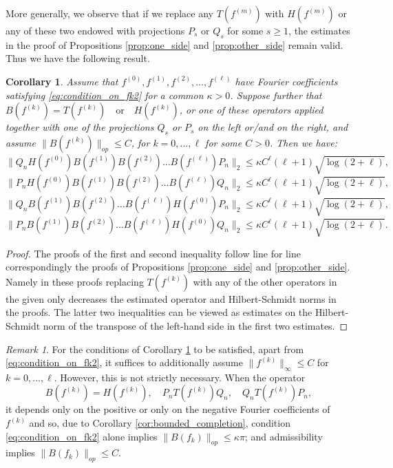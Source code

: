 \documentclass[11pt]{amsart}
\theoremstyle{plain}
\newtheorem{corollary}[theorem]{Corollary}
\theoremstyle{remark}
\newtheorem{remark}[theorem]{Remark}
\numberwithin{equation}{section}
\begin{document}
More generally, we observe that if we replace any $T(f^{(m)})$ with $H(f^{(m)})$ or any of these two endowed with projections $P_s$ or $Q_s$ for some $s\geq 1$, the estimates in the proof of Propositions \ref{prop:one_side} and \ref{prop:other_side} remain valid. Thus we have the following result. 

\begin{corollary} \label{cor:important_estimate}
Assume that 
$f^{(0)},f^{(1)}, f^{(2)}, \ldots, f^{(\ell)}$
%
have
Fourier coefficients 
satisfying \eqref{eq:condition_on_fk2} for a common $\kappa>0$.
%
%
Suppose further that 
$B(f^{(k)})= T(f^{(k)})\quad \text{or}\quad H(f^{(k)})$, or one of these operators applied together with one of the projections $Q_s$ or $P_s$ on the left or/and on the right, and assume $\|B(f^{(k)})\|_{op}\leq C$, for $k=0,\ldots,\ell$ for some $C>0$.
Then we have: 
\begin{equation}
\|Q_n H(f^{(0)}) B(f^{(1)}) B(f^{(2)})\ldots B(f^{(\ell)})P_n\|_2\leq \kappa C^{\ell} (\ell+1) \sqrt{\log(2+\ell)},
\end{equation} 
\begin{equation}
\|P_n H(f^{(0)}) B(f^{(1)}) B(f^{(2)})\ldots B(f^{(\ell)})Q_n\|_2\leq \kappa C^{\ell} (\ell+1) \sqrt{\log(2+\ell)},
\end{equation}
\begin{equation}
\|Q_n B(f^{(1)}) B(f^{(2)})\ldots B(f^{(\ell)})H(f^{(0)})P_n\|_2\leq \kappa C^{\ell} (\ell+1) \sqrt{\log(2+\ell)},
\end{equation} 
\begin{equation}
\|P_n   B(f^{(1)}) B(f^{(2)})\ldots B(f^{(\ell)})H(f^{(0)}) Q_n\|_2\leq \kappa C^{\ell} (\ell+1) \sqrt{\log(2+\ell)}.
\end{equation}
\end{corollary}

\begin{proof}
The proofs of the first and second inequality follow line for line correspondingly the proofs of Propositions \ref{prop:one_side} and \ref{prop:other_side}.  Namely in these proofs replacing $T(f^{(k)})$ with any of the other operators in the given only decreases the estimated operator and Hilbert-Schmidt norms in the proofs.
%
%
The latter two inequalities can be viewed as estimates on the Hilbert-Schmidt norm of the transpose of the left-hand side in the first two estimates. 
\end{proof}

\begin{remark}\label{rmk:important_estimate}
For the conditions of Corollary \ref{cor:important_estimate} to be satisfied, apart from \eqref{eq:condition_on_fk2}, it suffices to additionally assume $\|f^{(k)}\|_{\infty}\leq C$ for $k=0,\ldots, \ell$. However, this is not strictly necessary. When the operator
$$B(f^{(k)})=H(f^{(k)}),\quad P_nT(f^{(k)})Q_n, \quad Q_nT(f^{(k)})P_n,$$
it depends only on the positive or only on the negative Fourier coefficients of $f^{(k)}$ and so,
due to Corollary \ref{cor:bounded_completion}, condition \eqref{eq:condition_on_fk2} alone implies $\|B(f_k)\|_{op}\leq\kappa\pi$; and admissibility implies $\|B(f_k)\|_{op}\leq C$.
\end{remark}
\end{document}
